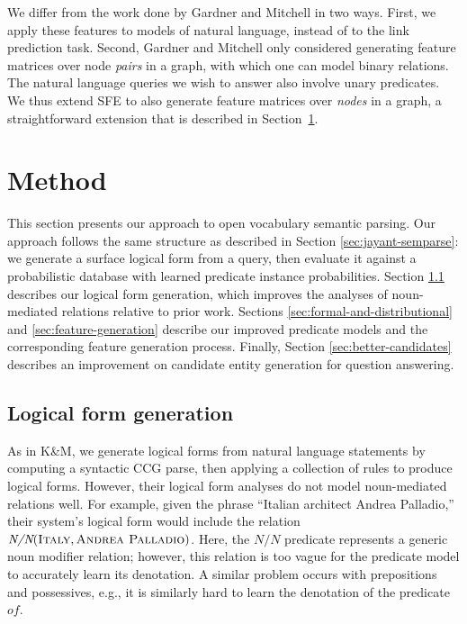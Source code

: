\documentclass[11pt]{article}
\newcommand{\secref}[1]{Section~\ref{sec:#1}}
\newcommand{\lexicalpredicate}[1]{\ensuremath{\textit{#1}}}
\newcommand{\entity}[1]{\ensuremath{\textsc{#1}}}
\begin{document}
We differ from the work done by Gardner and Mitchell in two ways.
First, we apply these features to models of natural language, instead
of to the link prediction task.  Second, Gardner and Mitchell only
considered generating feature matrices over node \emph{pairs} in a
graph, with which one can model binary relations.  The natural
language queries we wish to answer also involve unary predicates.  We
thus extend SFE to also generate feature matrices over \emph{nodes} in
a graph, a straightforward extension that is described in
\secref{method}.

\section{Method}
\label{sec:method}

This section presents our approach to open vocabulary semantic
parsing. Our approach follows the same structure as described in
Section \ref{sec:jayant-semparse}: we generate a surface logical form
from a query, then evaluate it against a probabilistic database with
learned predicate instance probabilities. Section \ref{sec:better-lfs}
describes our logical form generation, which improves the analyses of
noun-mediated relations relative to prior work. Sections
\ref{sec:formal-and-distributional} and \ref{sec:feature-generation}
describe our improved predicate models and the corresponding feature
generation process. Finally, Section \ref{sec:better-candidates}
describes an improvement on candidate entity generation for question
answering.



\subsection{Logical form generation}
\label{sec:better-lfs}

As in K\&M, we generate logical forms from natural language statements
by computing a syntactic CCG parse, then applying a collection of
rules to produce logical forms. However, their logical form analyses
do not model noun-mediated relations well. For example, given the
phrase ``Italian architect Andrea Palladio,'' their system's logical
form would include the relation
$\lexicalpredicate{N/N}(\entity{Italy}, \entity{Andrea
  Palladio})$. Here, the \lexicalpredicate{N/N} predicate represents a
generic noun modifier relation; however, this relation is too vague
for the predicate model to accurately learn its denotation. A similar
problem occurs with prepositions and possessives, e.g., it is
similarly hard to learn the denotation of the predicate
\lexicalpredicate{of}.
\end{document}
